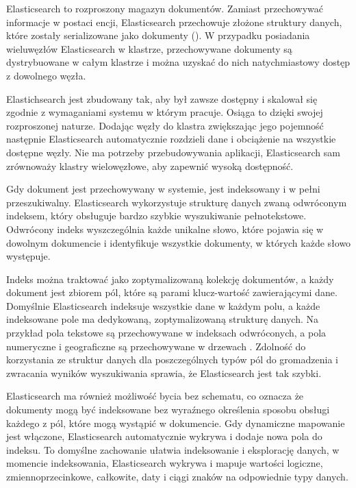 Elasticsearch to rozproszony magazyn dokumentów. Zamiast przechowywać informacje w postaci encji, Elasticsearch przechowuje złożone struktury danych, które zostały serializowane jako dokumenty  (). W przypadku posiadania wieluwęzłów Elasticsearch w klastrze, przechowywane dokumenty są dystrybuowane w całym klastrze i można uzyskać do nich natychmiastowy dostęp z dowolnego węzła\cite{elasticSearchManualDataIn}. 

Elastichsearch jest zbudowany tak, aby był zawsze dostępny i skalował się zgodnie z wymaganiami systemu w którym pracuje. Osiąga to dzięki swojej rozproszonej naturze. Dodając węzły do klastra zwiększając jego pojemność następnie Elasticsearch automatycznie rozdzieli dane i obciążenie na wszystkie dostępne węzły. Nie ma potrzeby przebudowywania aplikacji, Elasticsearch sam zrównoważy klastry wielowęzłowe, aby zapewnić wysoką dostępność.

Gdy dokument jest przechowywany w systemie, jest indeksowany i w pełni przeszukiwalny. Elasticsearch wykorzystuje strukturę danych zwaną odwróconym indeksem, który obsługuje bardzo szybkie wyszukiwanie pełnotekstowe. Odwrócony indeks wyszczególnia każde unikalne słowo, które pojawia się w dowolnym dokumencie i identyfikuje wszystkie dokumenty, w których każde słowo występuje\cite{elasticSearchManualDataIn}.  

Indeks można traktować jako zoptymalizowaną kolekcję dokumentów, a każdy dokument jest zbiorem pól, które są parami klucz-wartość zawierającymi dane. Domyślnie Elasticsearch indeksuje wszystkie dane w każdym polu, a każde indeksowane pole ma dedykowaną, zoptymalizowaną strukturę danych.
Na przykład pola tekstowe są przechowywane w indeksach odwróconych, a pola numeryczne i geograficzne są przechowywane w drzewach . Zdolność do korzystania ze struktur danych dla poszczególnych typów pól do gromadzenia i zwracania wyników wyszukiwania sprawia, że Elasticsearch jest tak szybki\cite{elasticSearchManualDataIn}.

Elasticsearch ma również możliwość bycia bez schematu, co oznacza że dokumenty mogą być indeksowane bez wyraźnego określenia sposobu obsługi każdego z pól, które mogą wystąpić w dokumencie. Gdy dynamiczne mapowanie jest włączone, Elasticsearch automatycznie wykrywa i dodaje nowa pola do indeksu. To domyślne zachowanie ułatwia indeksowanie i eksplorację danych, w momencie indeksowania, Elasticsearch wykrywa i mapuje wartości logiczne, zmiennoprzecinkowe, całkowite, daty i ciągi znaków na odpowiednie typy danych\cite{elasticSearchManualDataIn}. 

